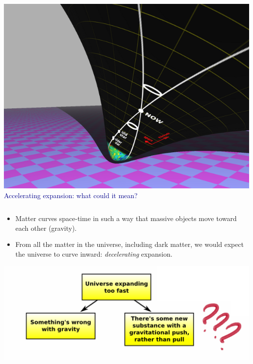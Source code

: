 \documentclass[compress]{beamer}
\begin{document}
\begin{frame}
\vspace{0.5 cm}
\begin{columns}
\includegraphics[width=\linewidth]{pictures/newinflation.png}
\textcolor{darkblue}{\Large Accelerating expansion: what could it mean?}
\end{columns}

\vspace{0.25 cm}
\begin{itemize}\setlength{\itemsep}{0.25 cm}
\item Matter curves space-time in such a way that massive objects move toward each other (gravity).

\item From all the matter in the universe, including dark matter, we would expect the universe to curve inward: {\it decelerating} expansion.
\end{itemize}

\begin{center}
\includegraphics[width=\linewidth]{pictures/darkenergy_flow_chart.png}
\end{center}
\end{frame}
\end{document}
